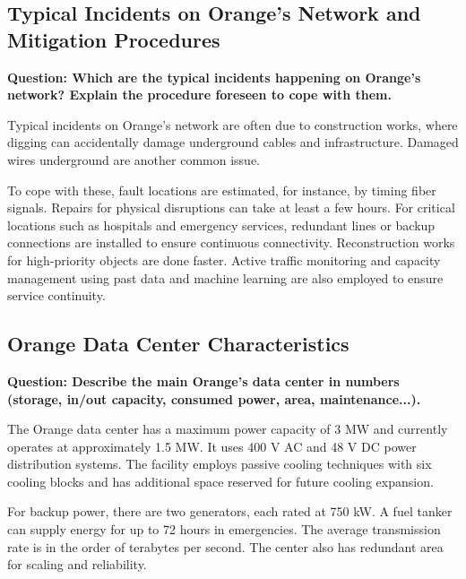 \documentclass[11pt]{article}
\begin{document}
        \subsection{Typical Incidents on Orange's Network and Mitigation Procedures}
        \noindent\textbf{Question: Which are the typical incidents happening on Orange's network? Explain the procedure foreseen to cope with them.}
        
        Typical incidents on Orange's network are often due to construction works, where digging can accidentally damage underground cables and infrastructure. Damaged wires underground are another common issue.
        
        To cope with these, fault locations are estimated, for instance, by timing fiber signals. Repairs for physical disruptions can take at least a few hours. For critical locations such as hospitals and emergency services, redundant lines or backup connections are installed to ensure continuous connectivity. Reconstruction works for high-priority objects are done faster. Active traffic monitoring and capacity management using past data and machine learning are also employed to ensure service continuity.
        
        \subsection{Orange Data Center Characteristics}
        \noindent\textbf{Question: Describe the main Orange's data center in numbers (storage, in/out capacity, consumed power, area, maintenance...).}
        
        The Orange data center has a maximum power capacity of 3 MW and currently operates at approximately 1.5 MW. It uses 400 V AC and 48 V DC power distribution systems. The facility employs passive cooling techniques with six cooling blocks and has additional space reserved for future cooling expansion.
        
        For backup power, there are two generators, each rated at 750 kW. A fuel tanker can supply energy for up to 72 hours in emergencies. The average transmission rate is in the order of terabytes per second. The center also has redundant area for scaling and reliability.
    			
\end{document}
